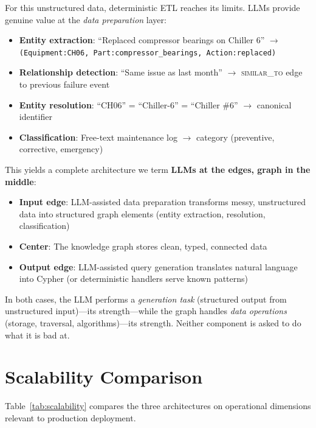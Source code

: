 \documentclass[11pt]{article}
\begin{document}
For this unstructured data, deterministic ETL reaches its limits. LLMs provide genuine value at the \emph{data preparation} layer:

\begin{itemize}[leftmargin=*]
  \item \textbf{Entity extraction}: ``Replaced compressor bearings on Chiller 6'' $\to$ \texttt{(Equipment:CH06, Part:compressor\_bearings, Action:replaced)}
  \item \textbf{Relationship detection}: ``Same issue as last month'' $\to$ \textsc{similar\_to} edge to previous failure event
  \item \textbf{Entity resolution}: ``CH06'' = ``Chiller-6'' = ``Chiller \#6'' $\to$ canonical identifier
  \item \textbf{Classification}: Free-text maintenance log $\to$ category (preventive, corrective, emergency)
\end{itemize}

This yields a complete architecture we term \textbf{LLMs at the edges, graph in the middle}:

\begin{itemize}[leftmargin=*]
  \item \textbf{Input edge}: LLM-assisted data preparation transforms messy, unstructured data into structured graph elements (entity extraction, resolution, classification)
  \item \textbf{Center}: The knowledge graph stores clean, typed, connected data
  \item \textbf{Output edge}: LLM-assisted query generation translates natural language into Cypher (or deterministic handlers serve known patterns)
\end{itemize}

In both cases, the LLM performs a \emph{generation task} (structured output from unstructured input)---its strength---while the graph handles \emph{data operations} (storage, traversal, algorithms)---its strength. Neither component is asked to do what it is bad at.

\section{Scalability Comparison}
\label{sec:scalability}

Table~\ref{tab:scalability} compares the three architectures on operational dimensions relevant to production deployment.
\end{document}
